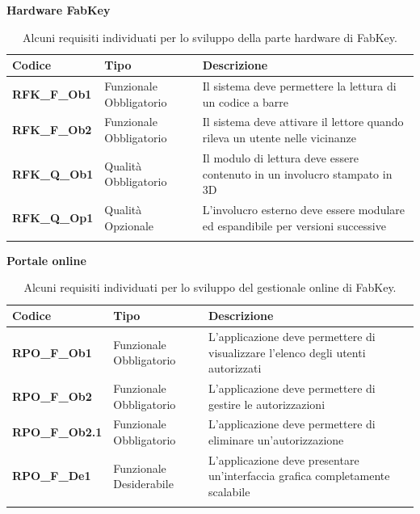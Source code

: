 \textbf{Hardware FabKey}
\renewcommand{\arraystretch}{2.0}
\begin{longtable}{|l|p{2.5cm}|p{8cm}|}
\hline
\textbf{Codice} & \textbf{Tipo} & \textbf{Descrizione} \\ 
\hline
\textbf{RFK\_F\_Ob1} & Funzionale \linebreak Obbligatorio & Il sistema deve permettere la lettura di un codice a barre \\ 
\hline
\textbf{RFK\_F\_Ob2} & Funzionale \linebreak Obbligatorio & Il sistema deve attivare il lettore quando rileva un utente nelle vicinanze \\
\hline
\textbf{RFK\_Q\_Ob1} & Qualità \linebreak Obbligatorio & Il modulo di lettura deve essere contenuto in un involucro stampato in 3D \\
\hline
\textbf{RFK\_Q\_Op1} & Qualità \linebreak Opzionale & L'involucro esterno deve essere modulare ed espandibile per versioni successive \\
\hline
\caption{Alcuni requisiti individuati per lo sviluppo della parte hardware di FabKey.}
\end{longtable}

\textbf{Portale online}
\renewcommand{\arraystretch}{2.0}
\begin{longtable}{|l|p{2.5cm}|p{8cm}|}
\hline
\textbf{Codice} & \textbf{Tipo} & \textbf{Descrizione} \\ 
\hline
\textbf{RPO\_F\_Ob1} & Funzionale \linebreak Obbligatorio & L'applicazione deve permettere di visualizzare l'elenco degli utenti autorizzati \\ 
\hline
\textbf{RPO\_F\_Ob2} & Funzionale \linebreak Obbligatorio & L'applicazione deve permettere di gestire le autorizzazioni \\
\hline
\textbf{RPO\_F\_Ob2.1} & Funzionale \linebreak Obbligatorio & L'applicazione deve permettere di eliminare un'autorizzazione \\
\hline
\textbf{RPO\_F\_De1} & Funzionale \linebreak Desiderabile & L'applicazione deve presentare un'interfaccia grafica completamente scalabile \\
\hline
\caption{Alcuni requisiti individuati per lo sviluppo del gestionale online di FabKey.}
\end{longtable}


